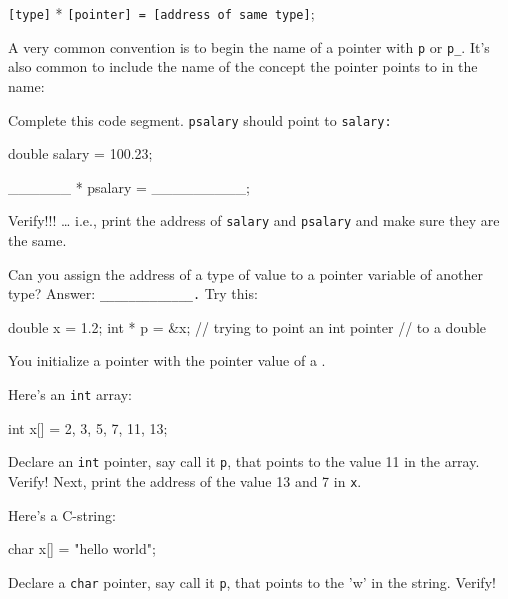 \begin{ex}
\begin{center}
\texttt{[type]} * \texttt{[pointer] = [address of same type]};
\end{center}

A very common convention is to begin the name of a pointer with \texttt{p} or \texttt{p_}. It's also common to include the name of the concept the pointer points to in the name:

\begin{ex}
Complete this code segment. \texttt{psalary} should
point to \texttt{salary:}

\begin{consolethree}[escapeinside=||]
double salary = 100.23;

______ * psalary = _________;
\end{consolethree}
Verify!!! \ldots{} i.e., print the address of \texttt{salary} and \texttt{psalary} and make sure they are the same.
\end{ex}

\begin{ex}
Can you assign the address of a type of value to a pointer variable of another type? Answer: \verb!_____________.! Try this:

\begin{consolethree}[escapeinside=||]
double x = 1.2;
int * p = &x; // trying to point an int pointer
              // to a double
\end{consolethree}
\end{ex}
You  initialize a pointer with the pointer value of a
.

\begin{ex}
Here's an \texttt{int} array:

\begin{consolethree}[escapeinside=||]
int x[] = {2, 3, 5, 7, 11, 13};
\end{consolethree}
\end{ex}
Declare an \texttt{int} pointer, say call it \texttt{p}, that points to the value 11 in the array. Verify! Next, print the address of the value 13 and 7 in \texttt{x}.

\begin{ex}
Here's a C-string:

\begin{consolethree}[escapeinside=||]
char x[] = "hello world";
\end{consolethree}
\end{ex}
Declare a \texttt{char} pointer, say call it \texttt{p}, that points to the
'w' in the string. Verify!


\end{ex}
